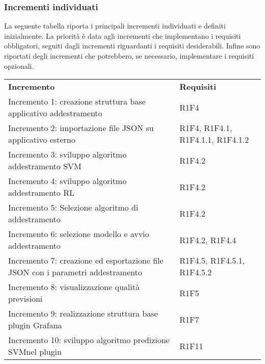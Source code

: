 \subsubsection{Incrementi individuati}
La seguente tabella riporta i principali incrementi individuati e definiti inizialmente. La priorità è data agli incrementi che implementano i requisiti obbligatori, seguiti dagli incrementi riguardanti i requisiti desiderabili. Infine sono riportati degli incrementi che potrebbero, se necessario, implementare i requisiti opzionali.
\begin{longtable} {
		>{\raggedright\arraybackslash}p{85mm}
		>{\raggedleft\arraybackslash}p{40mm}
	}
	\rowcolor{gray!50} 
	\textbf{Incremento} & 
	\textbf{Requisiti} 	\TBstrut \\
	
	Incremento 1: creazione struttura base applicativo addestramento &
	R1F4  \TBstrut \\ [2mm]		
	
	Incremento 2: importazione file JSON su applicativo esterno & 
	R1F4, R1F4.1, R1F4.1.1, R1F4.1.2  \TBstrut \\ [2mm]
	
	Incremento 3: sviluppo algoritmo addestramento SVM\glosp & 
	R1F4.2  \TBstrut \\ [2mm]
	
	Incremento 4: sviluppo algoritmo addestramento RL\glosp & 
	R1F4.2  \TBstrut \\ [2mm]
	
	Incremento 5: Selezione algoritmo di addestramento & 
	R1F4.2  \TBstrut \\ [2mm]
	
	Incremento 6: selezione modello e avvio addestramento & 
	R1F4.2, R1F4.4 \TBstrut \\ [2mm]
	
	Incremento 7: creazione ed esportazione file JSON con i parametri addestramento &
	R1F4.5, R1F4.5.1, R1F4.5.2 \TBstrut \\ [2mm]
	
	Incremento 8: visualizzazione qualità previsioni &
	R1F5 \TBstrut \\ [2mm]
	
	Incremento 9: realizzazione struttura base plugin Grafana\glosp &
	R1F7 \TBstrut \\ [2mm]
	
	Incremento 10: sviluppo algoritmo predizione SVM\glosp nel plugin &
	R1F11 \TBstrut \\ [2mm]
	

\end{longtable}
